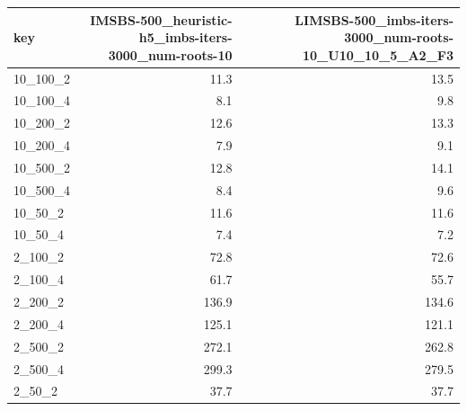 \begin{tabular}{lrr}
\toprule
     key &  IMSBS-500\_heuristic-h5\_imbs-iters-3000\_num-roots-10 &  LIMSBS-500\_imbs-iters-3000\_num-roots-10\_U10\_10\_5\_A2\_F3 \\
\midrule
10\_100\_2 &                                               11.3 &                                               13.5 \\
10\_100\_4 &                                                8.1 &                                                9.8 \\
10\_200\_2 &                                               12.6 &                                               13.3 \\
10\_200\_4 &                                                7.9 &                                                9.1 \\
10\_500\_2 &                                               12.8 &                                               14.1 \\
10\_500\_4 &                                                8.4 &                                                9.6 \\
 10\_50\_2 &                                               11.6 &                                               11.6 \\
 10\_50\_4 &                                                7.4 &                                                7.2 \\
 2\_100\_2 &                                               72.8 &                                               72.6 \\
 2\_100\_4 &                                               61.7 &                                               55.7 \\
 2\_200\_2 &                                              136.9 &                                              134.6 \\
 2\_200\_4 &                                              125.1 &                                              121.1 \\
 2\_500\_2 &                                              272.1 &                                              262.8 \\
 2\_500\_4 &                                              299.3 &                                              279.5 \\
  2\_50\_2 &                                               37.7 &                                               37.7 \\

\end{tabular}
